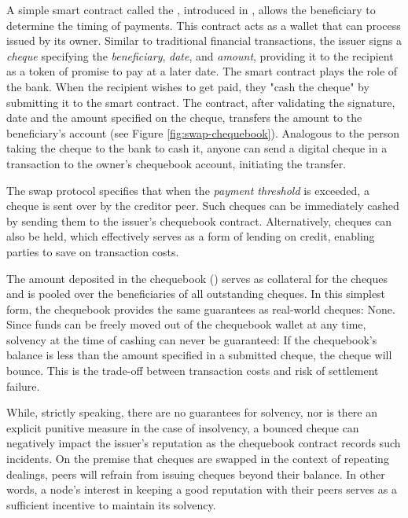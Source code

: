 A simple smart contract called the , introduced in \cite{ethersphere2016sw3}, allows the beneficiary to determine the timing of payments. This contract acts as a wallet that can process  issued by its owner. Similar to traditional financial transactions, the issuer signs a \emph{cheque} specifying the \emph{beneficiary}, \emph{date}, and \emph{amount}, providing it to the recipient as a token of promise to pay at a later date. The smart contract plays the role of the bank. When the recipient wishes to get paid, they "cash the cheque" by submitting it to the smart contract. The contract, after validating the signature, date and the amount specified on the cheque, transfers the amount to the beneficiary's account (see Figure \ref{fig:swap-chequebook}). Analogous to the person taking the cheque to the bank to cash it, anyone can send a digital cheque in a transaction to the owner's chequebook account, initiating the transfer. 

The swap protocol specifies that when the \emph{payment threshold} is exceeded, a cheque is sent over by the creditor peer. Such cheques can be immediately cashed by sending them to the issuer's chequebook contract. Alternatively, cheques can also be held, which effectively serves as a form of lending on credit, enabling parties to save on transaction costs. 

The amount deposited in the chequebook () serves as collateral for the cheques and is pooled over the beneficiaries of all outstanding cheques. In this simplest form, the chequebook provides the same guarantees as real-world cheques: None. Since funds can be freely moved out of the chequebook wallet at any time, solvency at the time of cashing can never be guaranteed: If the chequebook's balance is less than the amount specified in a submitted cheque, the cheque will bounce. This is the trade-off between transaction costs and risk of settlement failure.

While, strictly speaking, there are no guarantees for solvency, nor is there an explicit punitive measure in the case of insolvency, a bounced cheque can negatively impact the issuer's reputation as the chequebook contract records such incidents. On the premise that cheques are swapped in the context of repeating dealings, peers will refrain from issuing cheques beyond their balance. In other words, a node's interest in keeping a good reputation with their peers serves as a sufficient incentive to maintain its solvency.


